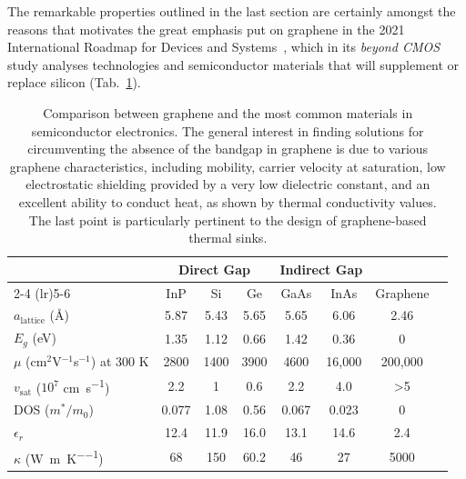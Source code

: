 The remarkable properties outlined in the last section are certainly amongst the reasons that motivates the great emphasis put on graphene in the 2021 International Roadmap for Devices and Systems~\cite{neisser2021international}, which in its \textit{beyond CMOS} study analyses technologies and semiconductor materials that will supplement or replace silicon (Tab.~\ref{intro:tab:graphene}).
%
\begin{table}
    \centering
    \begin{tabular}{l*{7}{c}}
        \toprule
                                                               & \multicolumn{3}{c}{Direct Gap} & \multicolumn{2}{c}{Indirect Gap}\T\B                                              \\
        \cmidrule(lr){2-4} \cmidrule(lr){5-6}
                                                               & InP                            & Si                                   & Ge   & GaAs  & InAs   & Graphene    \T\B   \\
        \midrule
        $a_\textrm{lattice}$ (\si{\angstrom})                  & 5.87                           & 5.43                                 & 5.65 & 5.65  & 6.06   & 2.46           \T  \\
        $E_g$ (eV)                                             & 1.35                           & 1.12                                 & 0.66 & 1.42  & 0.36   & 0               \T \\
        $\mu$ (cm$^2$V$^{-1}$s$^{-1}$) at 300 K                & 2800                           & 1400                                 & 3900 & 4600  & 16,000 & 200,000         \T \\
        $v_\textrm{sat}$ ($10^7$ \si{\centi\metre\per\second}) & 2.2                            & 1                                    & 0.6  & 2.2   & 4.0    & \textgreater{}5 \T \\
        DOS ($m^*/m_0$)                                        & 0.077                          & 1.08                                 & 0.56 & 0.067 & 0.023  & 0               \T \\
        $\epsilon_r$                                           & 12.4                           & 11.9                                 & 16.0 & 13.1  & 14.6   & 2.4             \T \\
        $\kappa$ (\si{\watt\per\metre\per\kelvin})             & 68                             & 150                                  & 60.2 & 46    & 27     & 5000            \T \\
        \bottomrule
    \end{tabular}
    \caption{Comparison between graphene and the most common materials in semiconductor electronics. The general interest in finding solutions for circumventing the absence of the bandgap in graphene is due to various graphene characteristics, including mobility, carrier velocity at saturation, low electrostatic shielding provided by a very low dielectric constant, and an excellent ability to conduct heat, as shown by thermal conductivity values. The last point is particularly pertinent to the design of graphene-based thermal sinks.}\label{intro:tab:graphene}
\end{table}

